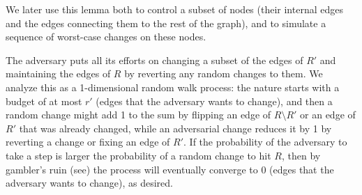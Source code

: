 \documentclass[letter,11pt]{article}
\begin{document}
We later use this lemma both to control a subset of nodes (their internal edges and the edges connecting them to the rest of the graph), and to simulate a sequence of worst-case changes on these nodes.

The adversary puts all its efforts on changing a subset of the edges of $R'$ and maintaining the edges of $R$ by reverting any random changes to them.
We analyze this as a 1-dimensional random walk process: 
the nature starts with a budget of at most $r'$ (edges that the adversary wants to change), and then a random change might add 1 to the sum by flipping an edge of $R\setminus R'$ or an edge of $R'$ that was already changed, 
while an adversarial change reduces it by 1 by reverting a change or fixing an edge of $R'$.
If the probability of the adversary to take a step is larger the probability of a random change to hit $R$, then by gambler’s ruin (see\cite[Section~7.2.1]{books:probability}) the process will eventually converge to $0$ (edges that the adversary wants to change), as desired.
\end{document}
